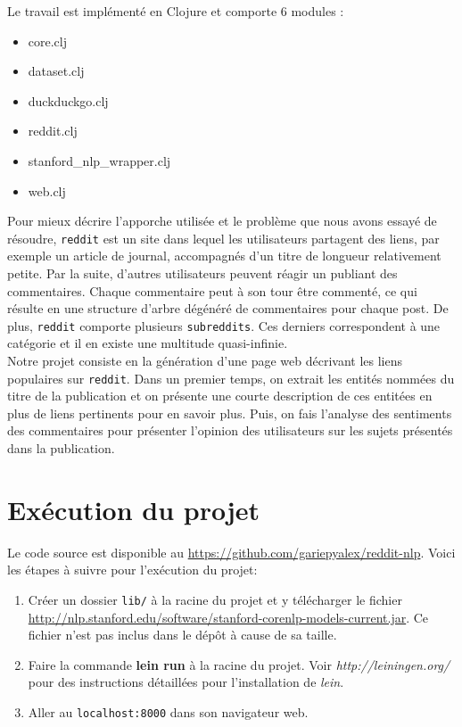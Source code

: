 \documentclass[12pt]{article}
\begin{document}
Le travail est implémenté en Clojure et comporte 6 modules :
\begin{itemize}
\item core.clj
\item dataset.clj
\item duckduckgo.clj
\item reddit.clj
\item stanford\_nlp\_wrapper.clj
\item web.clj
\end{itemize}

Pour mieux décrire l'apporche utilisée et le problème que nous avons essayé de résoudre, \verb;reddit; est un site dans lequel les utilisateurs partagent
des liens, par exemple un article de journal, accompagnés d'un titre de longueur relativement petite.
Par la suite, d'autres utilisateurs peuvent réagir un publiant des commentaires. Chaque commentaire peut à son tour être commenté,
ce qui résulte en une structure d'arbre dégénéré de commentaires pour chaque post.
De plus, \verb;reddit; comporte plusieurs \verb;subreddits;. Ces derniers correspondent à une catégorie et il en existe une multitude quasi-infinie.\\


Notre projet consiste en la génération d'une page web décrivant les liens populaires sur \verb;reddit;. Dans un premier temps, on extrait les entités nommées
du titre de la publication et on présente une courte description de ces entitées en plus de liens pertinents pour en savoir plus.
Puis, on fais l'analyse des sentiments des commentaires pour présenter l'opinion des utilisateurs sur les sujets présentés dans la publication.

\section{Exécution du projet}
Le code source est disponible au \url{https://github.com/gariepyalex/reddit-nlp}. Voici les étapes à suivre pour l'exécution du projet:
\begin{enumerate}
\item Créer un dossier \verb;lib/; à la racine du projet et y télécharger le fichier \url{http://nlp.stanford.edu/software/stanford-corenlp-models-current.jar}. Ce fichier n'est pas inclus dans le dépôt à cause de sa taille.
\item Faire la commande \textbf{lein run} à la racine du projet. Voir \emph{http://leiningen.org/} pour des instructions détaillées pour l'installation de \emph{lein}.
\item Aller au \verb;localhost:8000; dans son navigateur web.
\end{enumerate}
\end{document}
